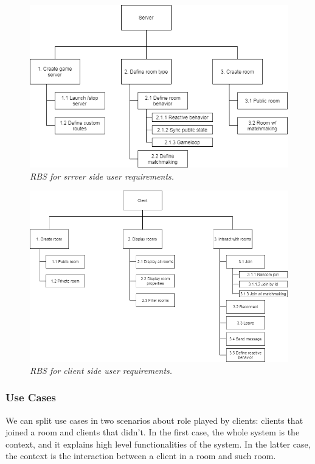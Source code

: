 \begin{figure}[H]
  \includegraphics[scale=0.5]{images/2-scoping/server-RBS.png}
   \centering  
   \caption{\textit{RBS for srrver side user requirements.}}
  \label{fig:server-RBS}
\end{figure}

\begin{figure}[H]
  \includegraphics[scale=0.5]{images/2-scoping/client-RBS.png}
   \centering  
   \caption{\textit{RBS for client side user requirements.}}
  \label{fig:client-RBS}
\end{figure}
 
\subsubsection{Use Cases}

We can split use cases in two scenarios about role played by clients: clients that joined a room and clients that didn't. In the first case, the whole system is the context, and it explains high level functionalities of the system. In the latter case, the context is the interaction between a client in a room and such room.

